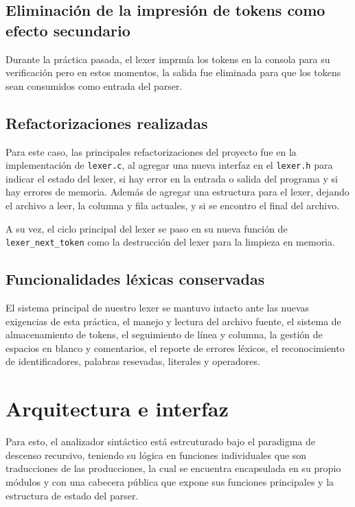 \documentclass[12pt]{article}
\begin{document}
\subsection{Eliminación de la impresión de tokens como efecto secundario}

Durante la práctica pasada, el lexer imprmía los tokens en la consola para su verificación
pero en estos momentos, la salida fue eliminada para que los tokens sean consumidos
como entrada del parser.

\subsection{Refactorizaciones realizadas}

Para este caso, las principales refactorizaciones del proyecto fue en la implementación de 
\texttt{lexer.c}, al agregar una nueva interfaz en el \texttt{lexer.h} para indicar
el estado del lexer, si hay error en la entrada o salida del programa y si hay errores
de memoria. Además de agregar una estructura para el lexer, dejando el archivo 
a leer, la columna y fila actuales, y si se encontro el final del archivo.

A su vez, el ciclo principal del lexer se paso en su nueva función de \texttt{lexer\_next\_token}
como la destrucción del lexer para la limpieza en memoria.

\subsection{Funcionalidades léxicas conservadas}

El sistema principal de nuestro lexer se mantuvo intacto ante las nuevas exigencias de esta 
práctica, el manejo y lectura del archivo fuente, el sistema de almacenamiento de tokens,
el seguimiento de línea y columna, la gestión de espacios en blanco y comentarios, 
el reporte de errores léxicos, el reconocimiento de identificadores, palabras resevadas,
literales y operadores.

\section{Arquitectura e interfaz}

Para esto, el analizador sintáctico está estrcuturado bajo el paradigma de descenso recursivo,
teniendo su lógica en funciones individuales que son traducciones de las producciones,
la cual se encuentra encapsulada en su propio módulos y con una cabecera pública que expone
sus funciones principales y la estructura de estado del parser.
\end{document}
